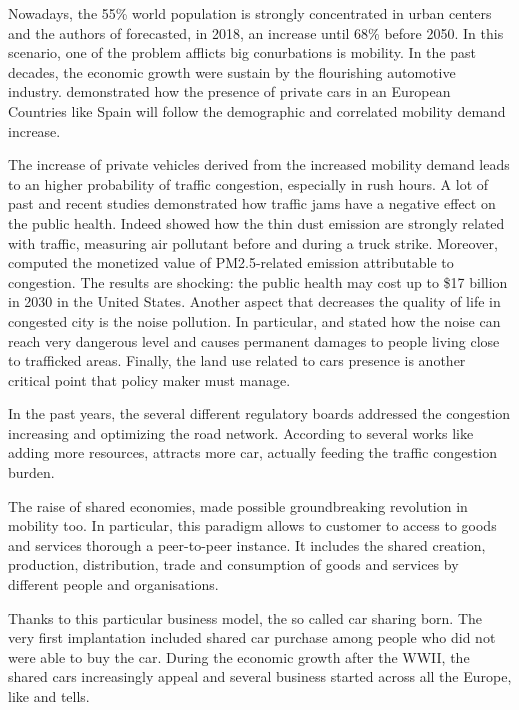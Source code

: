 Nowadays, the 55\% world population is strongly concentrated in urban centers and the authors of \cite{UNfuture} forecasted, in 2018, an increase until 68\% before 2050. In this scenario, one of the problem  afflicts big conurbations is mobility. In the past decades, the economic growth were sustain by the flourishing automotive industry. \cite{8_matas2008changes} demonstrated how the presence of private cars in an European Countries like Spain will follow the demographic and correlated mobility demand increase. 

The increase of private vehicles derived from the increased mobility demand leads to an higher probability of traffic congestion, especially in rush hours. A lot of past and recent studies demonstrated how traffic jams have a negative effect on the public health. Indeed  \cite{12_leiriao2020environmental} showed how the thin dust emission are strongly related with traffic, measuring air pollutant before and during a truck strike. Moreover,  \cite{13_levy2010evaluation} computed the monetized value of PM2.5-related emission attributable to congestion. The results are shocking: the public health may cost up to \$17 billion in 2030 in the United States. Another aspect that decreases the quality of life in congested city is the noise pollution. In particular, \cite{14_mehdi2011spatio} and \cite{15_jacyna2017noise} stated how the noise can reach very dangerous level and causes permanent damages to people living close to trafficked areas. Finally, the land use  related to cars presence is another critical point that policy maker must manage.

In the past years, the several different regulatory boards addressed the congestion increasing and optimizing the road network. According to several works like \cite{10_sweet2011does, 16_hymel2010induced, 17_naess2012traffic} adding more resources, attracts more car, actually feeding the traffic congestion burden.

The raise of shared economies, made possible groundbreaking revolution in mobility too. In particular, this paradigm allows to customer to  access to  goods and services thorough a peer-to-peer instance.  It includes the shared creation, production, distribution, trade and consumption of goods and services by different people and organisations. 

Thanks to this particular business model, the so called car sharing born. The very first implantation included shared car purchase among people who did not were able to buy the car. During the economic growth after the WWII, the shared cars increasingly appeal and several business started across all the Europe, like \cite{4_shaheen1999short} and \cite{5_shaheen1998carsharing} tells.

